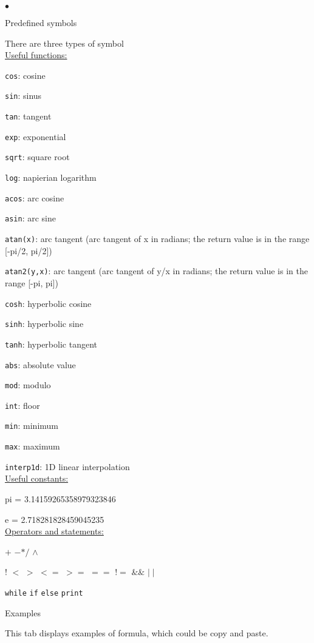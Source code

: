 {{{\begin{list}{$\bullet$}{}
\item Predefined symbols

There are three types of symbol \\

\underline{Useful functions:}

\texttt{cos}: cosine

\texttt{sin}: sinus

\texttt{tan}: tangent

\texttt{exp}: exponential

\texttt{sqrt}: square root

\texttt{log}: napierian logarithm

\texttt{acos}: arc cosine

\texttt{asin}: arc sine           

\texttt{atan(x)}: arc tangent (arc tangent of x in radians; the return value is in the range [-pi/2, pi/2])
 
\texttt{atan2(y,x)}: arc tangent (arc tangent of y/x in radians; the return value is in the range [-pi, pi])

\texttt{cosh}: hyperbolic cosine

\texttt{sinh}: hyperbolic sine

\texttt{tanh}: hyperbolic tangent

\texttt{abs}: absolute value

\texttt{mod}: modulo

\texttt{int}: floor

\texttt{min}: minimum

\texttt{max}: maximum

\texttt{interp1d}: 1D linear interpolation\\


\underline{Useful constants:}

pi = 3.14159265358979323846

e = 2.718281828459045235\\


\underline{Operators and statements:}

$+$ \qquad$-$\qquad $*$\qquad $/$ \qquad$\wedge$ 

! \qquad $<$ \qquad $>$ \qquad $<=$ \qquad $>=$ \qquad $==$ \qquad $!=$ \qquad $\&\&$ \qquad $\mid\mid$ 

\texttt{while} \texttt{if} \texttt{else} \texttt{print}


\item Examples

This tab displays examples of formula, which could be copy and paste.


\end{list}}}}
